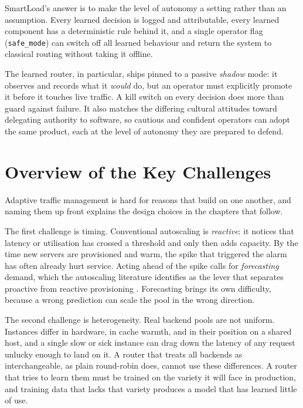 SmartLoad's answer is to make the level of autonomy a setting rather than an
assumption. Every learned decision is logged and attributable, every learned
component has a deterministic rule behind it, and a single operator flag
(\texttt{safe\_mode}) can switch off all learned behaviour and return the system
to classical routing without taking it offline.

The learned router, in particular, ships pinned to a passive \emph{shadow} mode:
it observes and records what it \emph{would} do, but an operator must explicitly
promote it before it touches live traffic. A kill switch on every decision does
more than guard against failure. It also matches the differing cultural attitudes
toward delegating authority to software, so cautious and confident operators can
adopt the same product, each at the level of autonomy they are prepared to
defend.

\section{Overview of the Key Challenges}
\label{sec:intro:challenges}

Adaptive traffic management is hard for reasons that build on one another, and
naming them up front explains the design choices in the chapters that follow.

The first challenge is timing. Conventional autoscaling is \emph{reactive}: it
notices that latency or utilisation has crossed a threshold and only then adds
capacity. By the time new servers are provisioned and warm, the spike that
triggered the alarm has often already hurt service. Acting ahead of the spike
calls for \emph{forecasting} demand, which the autoscaling literature identifies
as the lever that separates proactive from reactive provisioning
\cite{lorido2014autoscaling,roy2011autoscaling}. Forecasting brings its own
difficulty, because a wrong prediction can scale the pool in the wrong direction.

The second challenge is heterogeneity. Real backend pools are not uniform.
Instances differ in hardware, in cache warmth, and in their position on a shared
host, and a single slow or sick instance can drag down the latency of any request
unlucky enough to land on it. A router that treats all backends as
interchangeable, as plain round-robin does, cannot use these differences. A
router that tries to learn them must be trained on the variety it will face in
production, and training data that lacks that variety produces a model that has
learned little of use.

